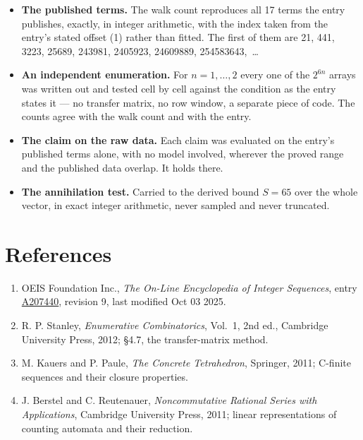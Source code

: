 \documentclass[11pt]{article}
\theoremstyle{definition}
\begin{document}
\begin{itemize}

\item {\bfseries The published terms.} The walk count reproduces all 17 terms the entry publishes, exactly, in integer arithmetic, with the index taken from the entry's stated offset (1) rather than fitted. The first of them are 21, 441, 3223, 25689, 243981, 2405923, 24609889, 254583643,~\dots

\item {\bfseries An independent enumeration.} For $n = 1,\dots,2$ every one of the $2^{6n}$ arrays was written out and tested cell by cell against the condition as the entry states it --- no transfer matrix, no row window, a separate piece of code. The counts agree with the walk count and with the entry.

\item {\bfseries The claim on the raw data.} Each claim was evaluated on the entry's published terms alone, with no model involved, wherever the proved range and the published data overlap. It holds there.

\item {\bfseries The annihilation test.} Carried to the derived bound $S = 65$ over the whole vector, in exact integer arithmetic, never sampled and never truncated.

\end{itemize}

\section{References}

\begin{enumerate}

\item OEIS Foundation Inc., \emph{The On-Line Encyclopedia of Integer Sequences}, entry \href{https://oeis.org/A207440}{A207440}, revision 9, last modified Oct 03 2025.

\item R. P. Stanley, \emph{Enumerative Combinatorics}, Vol.~1, 2nd ed., Cambridge University Press, 2012; \S4.7, the transfer-matrix method.

\item M. Kauers and P. Paule, \emph{The Concrete Tetrahedron}, Springer, 2011; C-finite sequences and their closure properties.

\item J. Berstel and C. Reutenauer, \emph{Noncommutative Rational Series with Applications}, Cambridge University Press, 2011; linear representations of counting automata and their reduction.

\end{enumerate}
\end{document}
